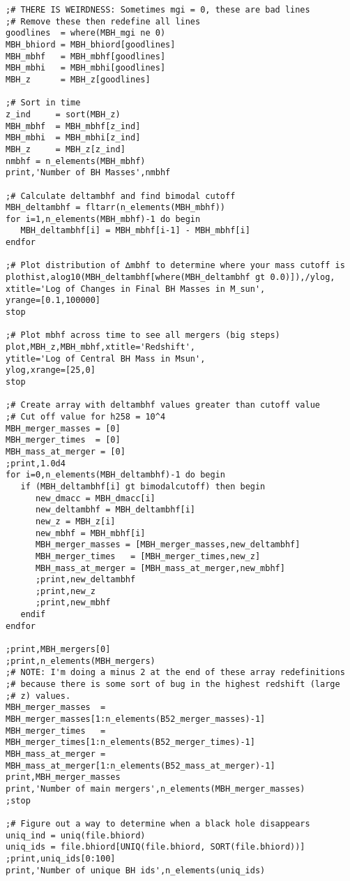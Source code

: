 \documentclass[12pt,headA,chapB]{fiskthesis}
\begin{document}
\begin{verbatim}
;# THERE IS WEIRDNESS: Sometimes mgi = 0, these are bad lines
;# Remove these then redefine all lines
goodlines  = where(MBH_mgi ne 0)
MBH_bhiord = MBH_bhiord[goodlines]
MBH_mbhf   = MBH_mbhf[goodlines]
MBH_mbhi   = MBH_mbhi[goodlines]
MBH_z      = MBH_z[goodlines]

;# Sort in time
z_ind     = sort(MBH_z)
MBH_mbhf  = MBH_mbhf[z_ind]
MBH_mbhi  = MBH_mbhi[z_ind]
MBH_z     = MBH_z[z_ind]
nmbhf = n_elements(MBH_mbhf)
print,'Number of BH Masses',nmbhf

;# Calculate deltambhf and find bimodal cutoff
MBH_deltambhf = fltarr(n_elements(MBH_mbhf))
for i=1,n_elements(MBH_mbhf)-1 do begin
   MBH_deltambhf[i] = MBH_mbhf[i-1] - MBH_mbhf[i]
endfor

;# Plot distribution of ∆mbhf to determine where your mass cutoff is
plothist,alog10(MBH_deltambhf[where(MBH_deltambhf gt 0.0)]),/ylog,
xtitle='Log of Changes in Final BH Masses in M_sun',
yrange=[0.1,100000]
stop

;# Plot mbhf across time to see all mergers (big steps)
plot,MBH_z,MBH_mbhf,xtitle='Redshift',
ytitle='Log of Central BH Mass in Msun',
ylog,xrange=[25,0]
stop

;# Create array with deltambhf values greater than cutoff value
;# Cut off value for h258 = 10^4
MBH_merger_masses = [0]
MBH_merger_times  = [0]
MBH_mass_at_merger = [0]
;print,1.0d4
for i=0,n_elements(MBH_deltambhf)-1 do begin
   if (MBH_deltambhf[i] gt bimodalcutoff) then begin
      new_dmacc = MBH_dmacc[i]
      new_deltambhf = MBH_deltambhf[i]
      new_z = MBH_z[i]
      new_mbhf = MBH_mbhf[i]
      MBH_merger_masses = [MBH_merger_masses,new_deltambhf] 
      MBH_merger_times   = [MBH_merger_times,new_z]
      MBH_mass_at_merger = [MBH_mass_at_merger,new_mbhf]
      ;print,new_deltambhf
      ;print,new_z
      ;print,new_mbhf
   endif
endfor

;print,MBH_mergers[0]
;print,n_elements(MBH_mergers)
;# NOTE: I'm doing a minus 2 at the end of these array redefinitions
;# because there is some sort of bug in the highest redshift (large
;# z) values.
MBH_merger_masses  = 
MBH_merger_masses[1:n_elements(B52_merger_masses)-1]
MBH_merger_times   = 
MBH_merger_times[1:n_elements(B52_merger_times)-1]
MBH_mass_at_merger = 
MBH_mass_at_merger[1:n_elements(B52_mass_at_merger)-1]
print,MBH_merger_masses
print,'Number of main mergers',n_elements(MBH_merger_masses)
;stop

;# Figure out a way to determine when a black hole disappears
uniq_ind = uniq(file.bhiord)
uniq_ids = file.bhiord[UNIQ(file.bhiord, SORT(file.bhiord))]
;print,uniq_ids[0:100]
print,'Number of unique BH ids',n_elements(uniq_ids)


\end{verbatim}
\end{document}
